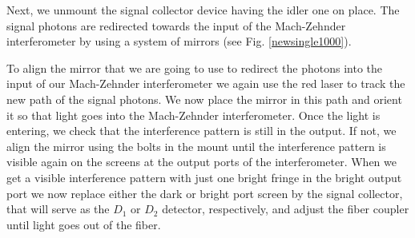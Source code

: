 \documentclass[12pt]{book}
\begin{document}
Next, we unmount the signal collector device having the idler one on place. The signal photons are redirected towards the input of the Mach-Zehnder interferometer by using a system of mirrors (see Fig. \ref{newsingle1000}).


To align the mirror that we are going to use to redirect the photons into the input of our Mach-Zehnder interferometer we again use the red laser to track the new path of the signal photons. We now place the mirror in this path and orient it so that light goes into the Mach-Zehnder interferometer. Once the light is entering, we check that the interference pattern is still in the output. If not, we align the mirror using the bolts in the mount until the interference pattern is visible again on the screens at the output ports of the interferometer. When we get a visible interference pattern  with just one bright fringe in the bright output port we now replace either the dark or bright port screen by the signal collector, that will serve as the $D_{1}$ or $D_{2}$ detector, respectively, and adjust the  fiber coupler until light goes out of the fiber. 
\end{document}
